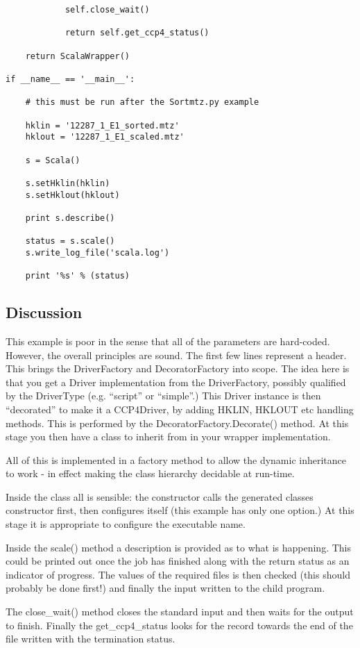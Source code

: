 \documentclass[a4paper, 11pt]{article}
\begin{document}
{\begin{verbatim}
            self.close_wait()

            return self.get_ccp4_status()

    return ScalaWrapper()

if __name__ == '__main__':

    # this must be run after the Sortmtz.py example

    hklin = '12287_1_E1_sorted.mtz'
    hklout = '12287_1_E1_scaled.mtz'

    s = Scala()

    s.setHklin(hklin)
    s.setHklout(hklout)

    print s.describe()

    status = s.scale()
    s.write_log_file('scala.log')
    
    print '%s' % (status)
\end{verbatim}
}
\subsection{Discussion}

This example is poor in the sense that all of the parameters are hard-coded.
However, the overall principles are sound. The first few lines represent a 
header. This brings the DriverFactory and DecoratorFactory into scope. The
idea here is that you get a Driver implementation from the DriverFactory,
possibly qualified by the DriverType (e.g. ``script'' or ``simple''.) This
Driver instance is then ``decorated'' to make it a CCP4Driver, by adding 
HKLIN, HKLOUT etc handling methods. This is performed by the 
DecoratorFactory.Decorate() method. At this stage you then have a class
to inherit from in your wrapper implementation.

All of this is implemented in a factory method to allow the dynamic 
inheritance to work - in effect making the class hierarchy decidable at 
run-time.

Inside the class all is sensible: the constructor calls the generated classes
constructor first, then configures itself (this example has only one option.)
At this stage it is appropriate to configure the executable name.

Inside the scale() method a description is provided as to what is happening.
This could be printed out once the job has finished along with the return
status as an indicator of progress. The values of the required files is then
checked (this should probably be done first!) and finally the input written
to the child program.

The close\_wait() method closes the standard input and then 
waits for the output
to finish. Finally the get\_ccp4\_status looks for the record towards the end
of the file written with the termination status.
\end{document}
